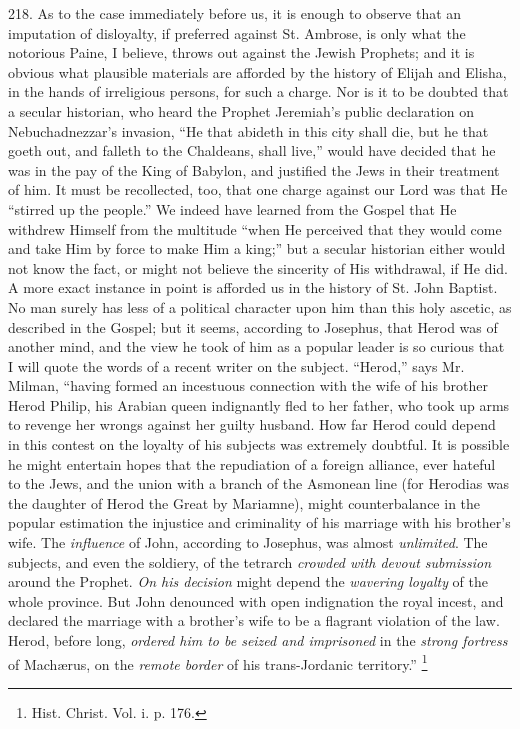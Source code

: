 218.
As to the case immediately before us, it is enough to observe that an
imputation of disloyalty, if preferred against St. Ambrose, is
only what the notorious Paine, I believe, throws out against the
Jewish Prophets; and it is obvious what plausible materials are
afforded by the history of Elijah and Elisha, in the hands of
irreligious persons, for such a charge. Nor is it to be doubted that a
secular historian, who heard the Prophet Jeremiah's public declaration
on Nebuchadnezzar's invasion, ``He that abideth in this city shall die,
but he that goeth out, and falleth to the Chaldeans, shall live,''
would have decided that he was in the pay of the King of Babylon, and
justified the Jews in their treatment of him. It must be recollected,
too, that one charge against our Lord was that He ``stirred up the
people.'' We indeed have learned from the Gospel that He withdrew
Himself from the multitude ``when He perceived that they would come and
take Him by force to make Him a king;'' but a secular historian either
would not know the fact, or might not believe the sincerity of His
withdrawal, if He did. A more exact instance in point is afforded us
in the history of St. John Baptist. No man surely has less of a
political character upon him than this holy ascetic, as described in
the Gospel; but it seems, according to Josephus, that Herod was of
another mind, and the view he took of him as a popular leader is so
curious that I will quote the words of a recent writer on the subject.
``Herod,'' says Mr. Milman, ``having formed an incestuous connection
with the wife of his brother Herod Philip, his Arabian queen
indignantly fled to her father, who took up arms to revenge her wrongs
against her guilty husband. How far Herod could depend in this contest
on the loyalty of his subjects was extremely doubtful. It is possible
he might entertain hopes that the repudiation of a foreign alliance,
ever hateful to the Jews, and the union with a branch of the Asmonean
line (for Herodias was the daughter of Herod the Great by Mariamne),
might counterbalance in the popular estimation the injustice and
criminality of his marriage with his brother's wife. The \emph{influence}
of John, according to Josephus, was almost \emph{unlimited}. The
subjects, and even the soldiery, of the tetrarch \emph{crowded with
devout submission} around the Prophet. \emph{On his decision} might
depend the \emph{wavering loyalty} of the whole province. But John
denounced with open indignation the royal incest, and declared the
marriage with a brother's wife to be a flagrant violation of the law.
Herod, before long, \emph{ordered him to be seized and imprisoned} in
the \emph{strong fortress} of Machærus, on the \emph{remote border} of his
trans-Jordanic territory.'' \footnote{Hist. Christ. Vol. i. p. 176.}

